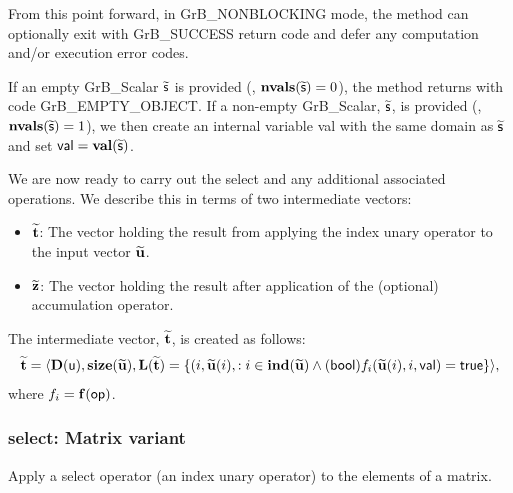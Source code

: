From this point forward, in {\sf GrB\_NONBLOCKING} mode, the method can optionally exit 
with {\sf GrB\_SUCCESS} return code and defer any computation and/or execution error codes.

{\color{red}
If an empty {\sf GrB\_Scalar} $\widetilde{\sf s}$ is provided (\ie, $\mathbf{nvals}(\widetilde{\sf s}) = 0$),
the method returns with code {\sf GrB\_EMPTY\_OBJECT}. If a non-empty {\sf GrB\_Scalar}, 
$\widetilde{\sf s}$, is provided (\ie, $\mathbf{nvals}(\widetilde{\sf s}) = 1$), we then create an 
internal variable {\sf val} with the same domain as $\widetilde{\sf s}$ and set 
${\sf val} = \mathbf{val}(\widetilde{\sf s})$.
}

We are now ready to carry out the {\sf select} and any additional 
associated operations.  We describe this in terms of two intermediate vectors:
\begin{itemize}
    \item ${\bf \widetilde{t}}$: The vector holding the result from applying the index unary operator to the input vector
    ${\bf \widetilde{u}}$.
    \item ${\bf \widetilde{z}}$: The vector holding the result after 
    application of the (optional) accumulation operator.
\end{itemize}

{\color{red}
The intermediate vector, ${\bf \widetilde{t}}$, is created as follows:
\[
\begin{aligned}
{\bf \widetilde{t}} &= \langle
\bold{D}({\sf u}), \bold{size}({\bf \widetilde{u}}),
\bold{L}({\bf \widetilde{t}}) =
\{(i,{\bf \widetilde{u}}(i), : i \in \bold{ind}({\bf \widetilde{u}}) \wedge ({\sf bool})f_i({\bf \widetilde{u}}(i),i,{\sf val}) = {\sf true} \} \rangle, \\
\end{aligned}
\]
where $f_{i} = \mathbf{f}({\sf op})$.
}






\subsubsection{{\sf select}: Matrix variant}

Apply a select operator (an index unary operator) to the elements of a matrix.

